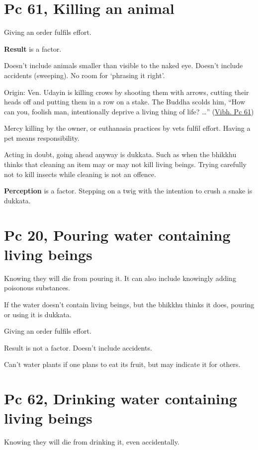 \section{Pc 61, Killing an animal}

Giving an order fulfils effort.

\textbf{Result} is a factor.

Doesn't include animals smaller than visible to the naked eye. Doesn't
include accidents (sweeping). No room for `phrasing it right'.

Origin: Ven. Udayin is killing crows by shooting them with arrows,
cutting their heads off and putting them in a row on a stake. The Buddha
scolds him, ``How can you, foolish man, intentionally deprive a living
thing of life? \ldots{}''
(\href{https://suttacentral.net/pli-tv-bu-vb-pc61/en/horner}{Vibh. Pc
61})

Mercy killing by the owner, or euthanasia practices by vets fulfil
effort. Having a pet means responsibility.

Acting in doubt, going ahead anyway is dukkata. Such as when the bhikkhu
thinks that cleaning an item may or may not kill living beings. Trying
carefully not to kill insects while cleaning is not an offence.

\textbf{Perception} is a factor. Stepping on a twig with the intention
to crush a snake is dukkata.

\section{Pc 20, Pouring water containing living beings}

Knowing they will die from pouring it. It can also include knowingly
adding poisonous substances.

If the water doesn't contain living beings, but the bhikkhu thinks it
does, pouring or using it is dukkata.

Giving an order fulfils effort.

Result is not a factor. Doesn't include accidents.

Can't water plants if one plans to eat its fruit, but may indicate it
for others.

\section{Pc 62, Drinking water containing living beings}

Knowing they will die from drinking it, even accidentally.

